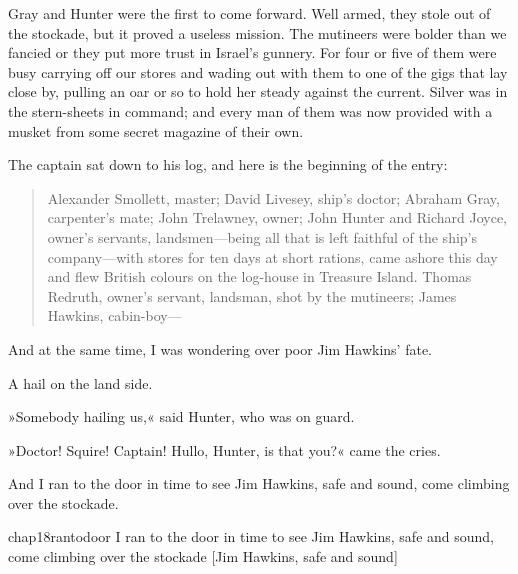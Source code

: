Gray and Hunter were the first to come forward. Well armed, they stole out of the stockade, but it proved a useless mission. The mutineers were bolder than we fancied or they put more trust in Israel's gunnery. For four or five of them were busy carrying off our stores and wading out with them to one of the gigs that lay close by, pulling an oar or so to hold her steady against the current. Silver was in the stern-sheets in command; and every man of them was now provided with a musket from some secret magazine of their own.

The captain sat down to his log, and here is the beginning of the entry:
\begin{quote}
Alexander Smollett, master; David Livesey, ship's doctor; Abraham Gray, carpenter's mate; John Trelawney, owner; John Hunter and Richard Joyce, owner's servants, landsmen—being all that is left faithful of the ship's company—with stores for ten days at short rations, came ashore this day and flew British colours on the log-house in Treasure Island. Thomas Redruth, owner's servant, landsman, shot by the mutineers; James Hawkins, cabin-boy—
\end{quote}

And at the same time, I was wondering over poor Jim Hawkins' fate.

A hail on the land side.

»Somebody hailing us,« said Hunter, who was on guard.

»Doctor! Squire! Captain! Hullo, Hunter, is that you?« came the cries.

And I ran to the door in time to see Jim Hawkins, safe and sound, come climbing over the stockade.



\begin{bwbigpic}
	[\picsize]
	{chap18rantodoor}
	{I ran to the door in time to see Jim Hawkins, safe and sound, come climbing over the stockade}
	[Jim Hawkins, safe and sound]
\end{bwbigpic}
